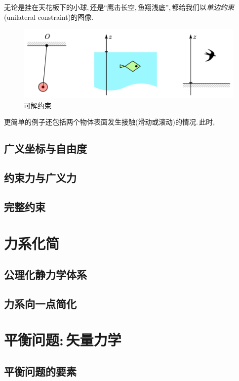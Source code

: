 无论是挂在天花板下的小球,\,还是``鹰击长空,\,鱼翔浅底'',\,都给我们以\emph{单边约束}(unilateral constraint)的图像.
\begin{figure}[H]
\centering
\includegraphics[width=14cm]{image/6-2-1.png}
\caption{可解约束}
\end{figure}

更简单的例子还包括两个物体表面发生接触(滑动或滚动)的情况.\,此时,\,

\subsection{广义坐标与自由度}

\subsection{约束力与广义力}

\subsection{完整约束}

\section{力系化简}

\subsection{公理化静力学体系}

\subsection{力系向一点简化}

\section{平衡问题:\,矢量力学}

\subsection{平衡问题的要素}

